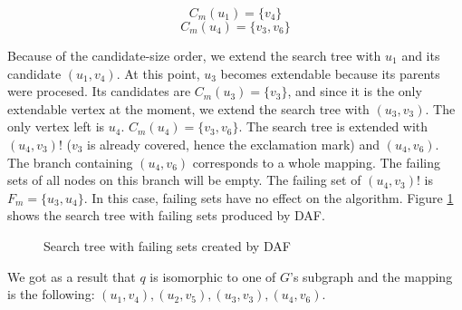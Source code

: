 \begin{example}
    \[ C_m(u_1) = \{v_4\} \]
    \[ C_m(u_4) = \{v_3, v_6\} \]

    Because of the candidate-size order, we extend the search tree with $u_1$ and its candidate $(u_1, v_4)$. At this point, $u_3$ 
    becomes extendable because its parents were procesed. Its candidates are $C_m(u_3) = \{v_3\}$, and since it is the only extendable
    vertex at the moment, we extend the search tree with $(u_3, v_3)$. The only vertex left is $u_4$. $C_m(u_4) = \{v_3, v_6\}$. The
    search tree is extended with $(u_4, v_3)!$ ($v_3$ is already covered, hence the exclamation mark) and $(u_4, v_6)$. The branch
    containing $(u_4, v_6)$ corresponds to a whole mapping. The failing sets of all nodes on this branch will be empty. The failing set
    of $(u_4, v_3)!$ is $F_m = \{u_3, u_4\}$. In this case, failing sets have no effect on the algorithm. Figure \ref{fig:dafst} shows 
    the search tree with failing sets produced by DAF.

    \begin{figure}[h!]
        \centering
        
        
        \caption{Search tree with failing sets created by DAF}
        \label{fig:dafst}
    \end{figure}

    We got as a result that $q$ is isomorphic to one of $G$'s subgraph and the mapping is the following: $(u_1, v_4),(u_2, v_5),(u_3, v_3),(u_4, v_6)$.

\end{example}
